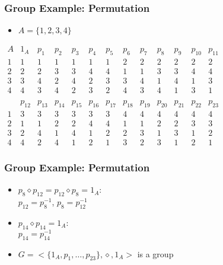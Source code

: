 \documentclass[dvipsnames]{beamer}
\begin{document}
\begin{frame}
  \frametitle{Group Example: Permutation}

  \begin{itemize}
   \item $A=\{1,2,3,4\}$
  \end{itemize}

  \medskip
  $\begin{array}{c|cccccccccccccccccccccccc}
      A & 1_{A}  & p_{1}  & p_{2}  & p_{3}  & p_{4}  & p_{5}
        & p_{6}  & p_{7}  & p_{8}  & p_{9}  & p_{10} & p_{11}\\\hline
      1 &   1    &   1    &   1    &   1    &   1    &  1
        &   2    &   2    &   2    &   2    &   2    &  2\\
      2 &   2    &   2    &   3    &   3    &   4    &  4
        &   1    &   1    &   3    &   3    &   4    &  4\\
      3 &   3    &   4    &   2    &   4    &   2    &  3
        &   3    &   4    &   1    &   4    &   1    &  3\\
      4 &   4    &   3    &   4    &   2    &   3    &  2
        &   4    &   3    &   4    &   1    &   3    &  1\\\\
        & p_{12} & p_{13} & p_{14} & p_{15} & p_{16} & p_{17}
        & p_{18} & p_{19} & p_{20} & p_{21} & p_{22} & p_{23}\\\hline
      1 &   3    &   3    &   3    &   3    &   3    &  3
        &   4    &   4    &   4    &   4    &   4    &  4\\
      2 &   1    &   1    &   2    &   2    &   4    &  4
        &   1    &   1    &   2    &   2    &   3    &  3\\
      3 &   2    &   4    &   1    &   4    &   1    &  2
        &   2    &   3    &   1    &   3    &   1    &  2\\
      4 &   4    &   2    &   4    &   1    &   2    &  1
        &   3    &   2    &   3    &   1    &   2    &  1
  \end{array}$
\end{frame}

\begin{frame}
  \frametitle{Group Example: Permutation}

  \begin{itemize}
    \item $p_8 \diamond p_{12}=p_{12} \diamond p_8=1_A$:\\
      $p_{12} = p_8^{-1}$, $p_8 = p_{12}^{-1}$
    \medskip
    \item $p_{14} \diamond p_{14}=1_A$:\\
      $p_{14} = p_{14}^{-1}$

    \pause
    \bigskip
    \item $G=<\{1_A,p_1,\dots,p_{23}\},\diamond,1_A>$ is a group
  \end{itemize}
\end{frame}
\end{document}
